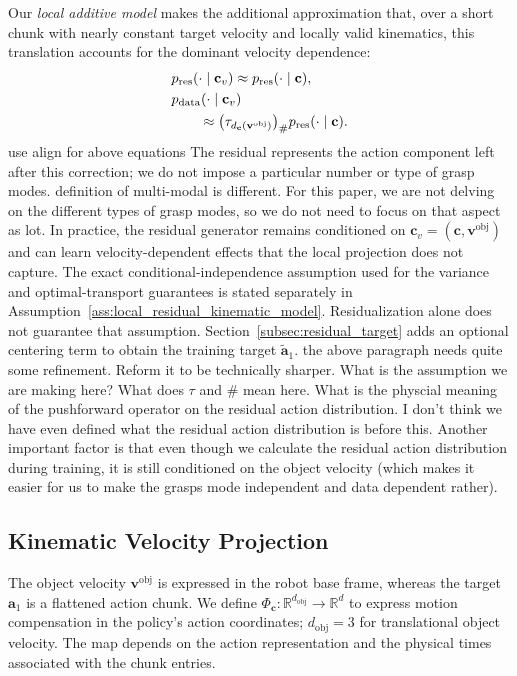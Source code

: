 \documentclass[10pt,twocolumn,letterpaper]{article}
\newcommand{\EditAP}[1]{{\color{blue} #1}}
\begin{document}
Our \emph{local additive model} makes the additional approximation that,
over a short chunk with nearly constant target velocity and locally valid
kinematics, this translation accounts for the dominant velocity dependence:
\begin{align}
    &p_{\mathrm{res}}(\cdot\mid\mathbf c_v)
    \approx p_{\mathrm{res}}(\cdot\mid\mathbf c), \notag\\
    &p_{\mathrm{data}}(\cdot\mid\mathbf c_v) \notag\\
    &\qquad\approx\bigl(\tau_{d_{\mathbf c}(\mathbf v^{\mathrm{obj}})}\bigr)_{\#}
    p_{\mathrm{res}}(\cdot\mid\mathbf c).
    \label{eq:velocity_pushforward_model}
\end{align}
\EditAP{use align for above equations}
The residual represents the action component left after this correction;
we do not impose a particular number or type of grasp modes. \EditAP{definition of multi-modal is different. For this paper, we are not delving on the different types of grasp modes, so we do not need to focus on that aspect as lot.}
In practice, the residual generator remains conditioned on
$\mathbf c_v=(\mathbf c,\mathbf v^{\mathrm{obj}})$ and can learn
velocity-dependent effects that the local projection does not capture.
The exact conditional-independence assumption used for the variance and
optimal-transport guarantees is stated separately in
Assumption~\ref{ass:local_residual_kinematic_model}. Residualization alone
does not guarantee that assumption. Section~\ref{subsec:residual_target}
adds an optional centering term to obtain the training target
$\widetilde{\mathbf a}_1$.
\EditAP{the above paragraph needs quite some refinement. Reform it to be technically sharper. What is the assumption we are making here? What does $\tau$ and $\#$ mean here. What is the physcial meaning of the pushforward operator on the residual action distribution. I don't think we have even defined what the residual action distribution is before this. Another important factor is that even though we calculate the residual action distribution during training, it is still conditioned on the object velocity (which makes it easier for us to make the grasps mode independent and data dependent rather).}

\subsection{Kinematic Velocity Projection}
\label{subsec:kinematic_projection}

The object velocity $\mathbf v^{\mathrm{obj}}$ is expressed in the robot base
frame, whereas the target $\mathbf a_1$ is a flattened action chunk.
We define $\Phi_{\mathbf c}:\mathbb R^{d_{\mathrm{obj}}}\rightarrow\mathbb R^d$
to express motion compensation in the policy's action coordinates;
$d_{\mathrm{obj}}=3$ for translational object velocity.
The map depends on the action representation and the physical times
associated with the chunk entries.
\end{document}
